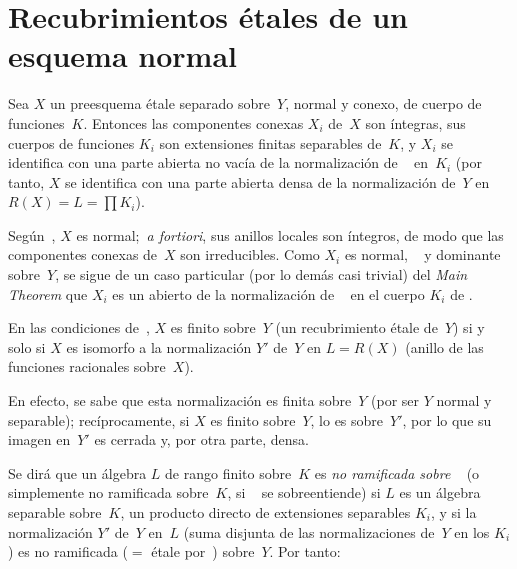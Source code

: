 \section{Recubrimientos étales de un esquema normal}
\label{I.10}

\begin{proposition}
\label{I.10.1}
Sea $X$ un preesquema étale separado sobre~$Y$, normal y conexo, de cuerpo de funciones~$K$. Entonces las componentes conexas $X_i$ de~$X$ son íntegras, sus cuerpos de funciones $K_i$ son extensiones finitas separables de~$K$, y $X_i$ se identifica con una parte abierta no vacía de la normalización de
\ %
en~$K_i$ (por tanto, $X$ se identifica con una parte abierta densa de la normalización de~$Y$ en $R(X)=L=\prod K_i$).
\end{proposition}

Según~, $X$ es normal; \,\emph{a fortiori}, sus anillos locales son íntegros, de modo que las componentes conexas de~$X$ son irreducibles. Como $X_i$ es normal,
\ %
y dominante sobre~$Y$, se sigue de un caso particular (por lo demás casi trivial) del \emph{Main Theorem} que $X_i$ es un abierto de la normalización de
\ %
en el cuerpo $K_i$ de
.%

\begin{corollaire}
\label{I.10.2}
En las condiciones de~, $X$ es finito sobre~$Y$ (\ie un recubrimiento étale de~$Y$) si y solo si $X$ es isomorfo a la normalización $Y'$ de~$Y$ en $L=R(X)$ (anillo de las funciones racionales sobre~$X$).
\end{corollaire}

En efecto, se sabe que esta normalización es finita sobre~$Y$ (por ser $Y$ normal y
\ %
separable); recíprocamente, si $X$ es finito sobre~$Y$, lo es sobre~$Y'$, por lo que su imagen en~$Y'$ es cerrada y, por otra parte, densa.

Se dirá que un álgebra $L$ de rango finito sobre~$K$ es \emph{no ramificada sobre
}\ %
(o simplemente no ramificada sobre~$K$, si
\ %
se sobreentiende) si $L$ es un álgebra separable sobre~$K$, \ie un producto directo de extensiones separables $K_i$, y si la normalización $Y'$ de~$Y$ en~$L$ (suma disjunta de las normalizaciones de~$Y$ en los $K_i$) es no ramificada ($=$ étale por~) sobre~$Y$. Por tanto:

